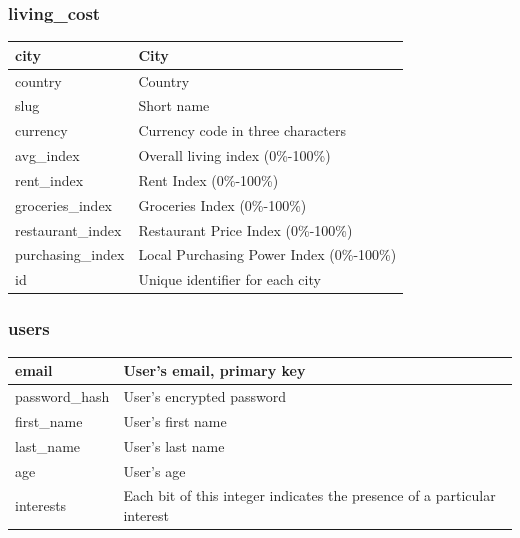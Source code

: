 \documentclass[12pt]{article}
\begin{document}
\subsubsection{living\_cost}
\label{sec:orgd0638dd}
\begin{center}
\begin{tabular}{p{3cm}|p{11cm}}
city & City\\[0pt]
  \hline
country & Country\\[0pt]
  \hline
slug & Short name\\[0pt]
  \hline
currency & Currency code in three characters\\[0pt]
  \hline
avg\_index & Overall living index (0\%-100\%)\\[0pt]
  \hline
rent\_index & Rent Index (0\%-100\%)\\[0pt]
  \hline
groceries\_index & Groceries Index (0\%-100\%)\\[0pt]
  \hline
restaurant\_index & Restaurant Price Index (0\%-100\%)\\[0pt]
  \hline
purchasing\_index & Local Purchasing Power Index (0\%-100\%)\\[0pt]
  \hline
id & Unique identifier for each city\\[0pt]
\end{tabular}
\end{center}

\subsubsection{users}
\label{sec:orgcd3ec2f}
\begin{center}
\begin{tabular}{p{3cm}|p{11cm}}
email & User's email, primary key\\[0pt]
  \hline
password\_hash & User's encrypted password\\[0pt]
  \hline
first\_name & User's first name\\[0pt]
  \hline
last\_name & User's last name\\[0pt]
  \hline
age & User's age\\[0pt]
  \hline
interests & Each bit of this integer indicates the presence of a particular interest\\[0pt]
\end{tabular}
\end{center}
\end{document}
